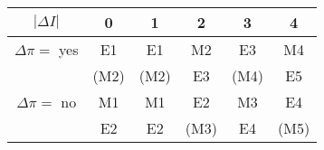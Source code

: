 \begin{tabular}{cccccc}
\hline
$|\Delta I|$       & 0    &  1   &  2   &  3   & 4    \\
\hline
$\Delta \pi =$ yes &  E1  &  E1  &  M2  &  E3  &  M4  \\
                   & (M2) & (M2) &  E3  & (M4) &  E5  \\
\hline
$\Delta \pi =$ no  &  M1  &  M1  &  E2  &  M3  &  E4  \\
                   &  E2  &  E2  & (M3) &  E4  & (M5) \\
\hline
\end{tabular}